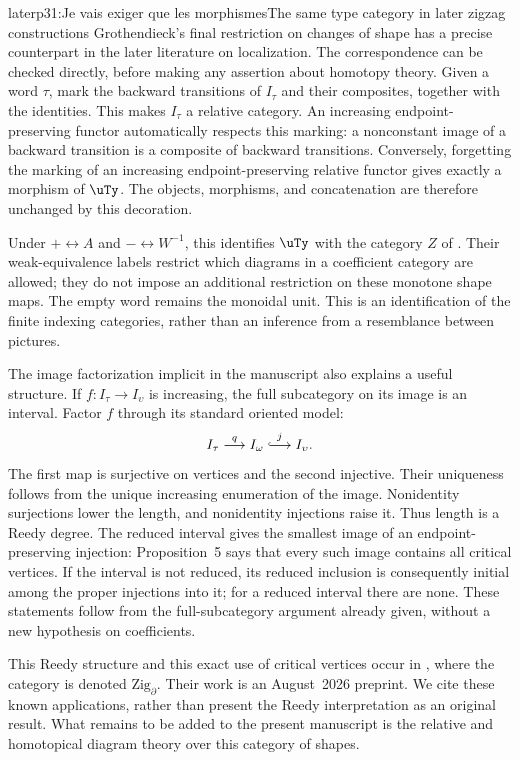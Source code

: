 \begin{dcomment}{later}{p31:Je vais exiger que les morphismes}{The same type category in later zigzag constructions}
Grothendieck's final restriction on changes of shape has a precise counterpart in the later literature on localization. The correspondence can be checked directly, before making any assertion about homotopy theory. Given a word $\tau$, mark the backward transitions of $I_\tau$ and their composites, together with the identities. This makes $I_\tau$ a relative category. An increasing endpoint-preserving functor automatically respects this marking: a nonconstant image of a backward transition is a composite of backward transitions. Conversely, forgetting the marking of an increasing endpoint-preserving relative functor gives exactly a morphism of $\uTy$. The objects, morphisms, and concatenation are therefore unchanged by this decoration.

Under $+\leftrightarrow A$ and $-\leftrightarrow W^{-1}$, this identifies $\uTy$ with the category $Z$ of \citet[Definition~3.5, Remark~3.6, and footnotes~8--10, pp.~341--342]{MazelGee2018Hammocks}. Their weak-equivalence labels restrict which diagrams in a coefficient category are allowed; they do not impose an additional restriction on these monotone shape maps. The empty word remains the monoidal unit. This is an identification of the finite indexing categories, rather than an inference from a resemblance between pictures.

The image factorization implicit in the manuscript also explains a useful structure. If $f:I_\tau\to I_\upsilon$ is increasing, the full subcategory on its image is an interval. Factor $f$ through its standard oriented model:
\[
 I_\tau\mathrel{\mathop{\longrightarrow}^{q}}I_\omega
 \mathrel{\mathop{\lhook\joinrel\longrightarrow}^{j}}I_\upsilon.
\]
The first map is surjective on vertices and the second injective. Their uniqueness follows from the unique increasing enumeration of the image. Nonidentity surjections lower the length, and nonidentity injections raise it. Thus length is a Reedy degree. The reduced interval gives the smallest image of an endpoint-preserving injection: Proposition~5 says that every such image contains all critical vertices. If the interval is not reduced, its reduced inclusion is consequently initial among the proper injections into it; for a reduced interval there are none. These statements follow from the full-subcategory argument already given, without a new hypothesis on coefficients.

This Reedy structure and this exact use of critical vertices occur in \citet[Example~4.12 and Lemma~4.16]{ArakawaCnossen2026}, where the category is denoted $\mathrm{Zig}_{\partial}$. Their work is an August~2026 preprint. We cite these known applications, rather than present the Reedy interpretation as an original result. What remains to be added to the present manuscript is the relative and homotopical diagram theory over this category of shapes.
\end{dcomment}

